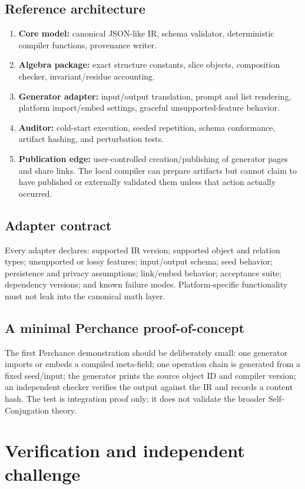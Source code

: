 \documentclass[11pt,oneside]{article}
\begin{document}
\subsection{Reference architecture}
\begin{enumerate}
  \item \textbf{Core model:} canonical JSON-like IR, schema validator, deterministic compiler functions, provenance writer.
  \item \textbf{Algebra package:} exact structure constants, slice objects, composition checker, invariant/residue accounting.
  \item \textbf{Generator adapter:} input/output translation, prompt and list rendering, platform import/embed settings, graceful unsupported-feature behavior.
  \item \textbf{Auditor:} cold-start execution, seeded repetition, schema conformance, artifact hashing, and perturbation tests.
  \item \textbf{Publication edge:} user-controlled creation/publishing of generator pages and share links. The local compiler can prepare artifacts but cannot claim to have published or externally validated them unless that action actually occurred.
\end{enumerate}

\subsection{Adapter contract}
Every adapter declares: supported IR version; supported object and relation types; unsupported or lossy features; input/output schema; seed behavior; persistence and privacy assumptions; link/embed behavior; acceptance suite; dependency versions; and known failure modes. Platform-specific functionality must not leak into the canonical math layer.

\subsection{A minimal Perchance proof-of-concept}
The first Perchance demonstration should be deliberately small: one generator imports or embeds a compiled meta-field; one operation chain is generated from a fixed seed/input; the generator prints the source object ID and compiler version; an independent checker verifies the output against the IR and records a content hash. The test is integration proof only; it does not validate the broader Self-Conjugation theory.

\section{Verification and independent challenge}
\end{document}
